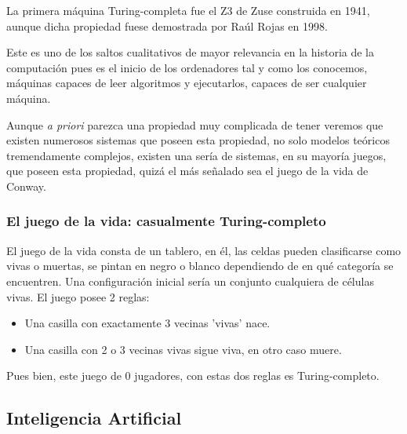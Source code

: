 \vspace{10px}

La primera máquina Turing-completa fue el Z3 de Zuse construida en 1941, aunque dicha propiedad fuese demostrada por Raúl Rojas en 1998.

\vspace{10px}

Este es uno de los saltos cualitativos de mayor relevancia en la historia de la computación pues es el inicio de los ordenadores tal y como los conocemos, máquinas capaces de leer algoritmos y ejecutarlos, capaces de ser cualquier máquina.

\vspace{10px}

Aunque \textit{a priori} parezca una propiedad muy complicada de tener veremos que existen numerosos sistemas que poseen esta propiedad, no solo modelos teóricos tremendamente complejos, existen una sería de sistemas, en su mayoría juegos, que poseen esta propiedad, quizá el más señalado sea el juego de la vida de Conway.



\subsubsection{El juego de la vida: casualmente Turing-completo}

El juego de la vida consta de un tablero, en él, las celdas pueden clasificarse como vivas o muertas, se pintan en negro o blanco dependiendo de en qué categoría se encuentren. Una configuración inicial sería un conjunto cualquiera de células vivas. El juego posee 2 reglas:

\begin{multicols}{2}
	\begin{itemize}
		\item Una casilla con exactamente 3 vecinas 'vivas' nace.
		\item Una casilla con 2 o 3 vecinas vivas sigue viva, en otro caso muere.
	\end{itemize}
\end{multicols}


Pues bien, este juego de 0 jugadores, con estas dos reglas es Turing-completo.

\subsection{Inteligencia Artificial}

